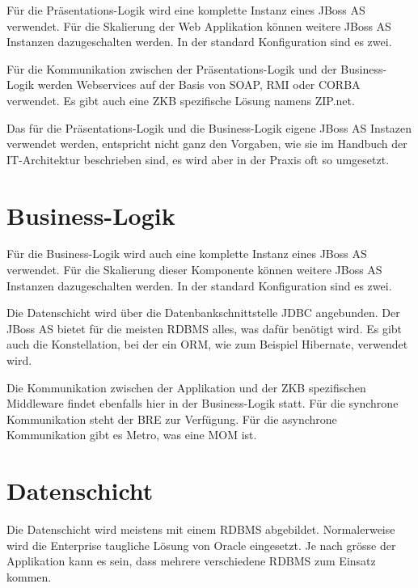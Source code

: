   Für die Präsentations-Logik wird eine komplette Instanz eines JBoss AS
  verwendet. Für die Skalierung der Web Applikation können weitere
  JBoss AS Instanzen dazugeschalten werden. In der standard Konfiguration sind
  es zwei.
  
  Für die Kommunikation zwischen der Präsentations-Logik und der Business-Logik
  werden Webservices auf der Basis von \ac{SOAP}, \ac{RMI} oder \ac{CORBA}
  verwendet. Es gibt auch eine \ac{ZKB} spezifische Lösung namens ZIP.net.
  
  Das für die Präsentations-Logik und die Business-Logik eigene JBoss AS
  Instazen verwendet werden, entspricht nicht ganz den Vorgaben, wie sie
  im Handbuch der IT-Architektur beschrieben sind, es wird aber in der Praxis
  oft so umgesetzt.
    
  \section{Business-Logik}
  
  Für die Business-Logik wird auch eine komplette Instanz eines JBoss AS
  verwendet. Für die Skalierung dieser Komponente können weitere JBoss AS
  Instanzen dazugeschalten werden. In der standard Konfiguration sind es zwei.
  
  Die Datenschicht wird über die Datenbankschnittstelle \ac{JDBC} angebunden.
  Der JBoss AS bietet für die meisten \ac{RDBMS} alles, was dafür benötigt
  wird. Es gibt auch die Konstellation, bei der ein \ac{ORM}, wie zum Beispiel
  Hibernate, verwendet wird.
  
  Die Kommunikation zwischen der Applikation und der ZKB spezifischen Middleware
  findet ebenfalls hier in der Business-Logik statt. Für die synchrone
  Kommunikation steht der \ac{BRE} zur Verfügung. Für die asynchrone
  Kommunikation gibt es Metro, was eine \ac{MOM} ist.
    
  \section{Datenschicht}
  
  Die Datenschicht wird meistens mit einem \ac{RDBMS} abgebildet. Normalerweise
  wird die Enterprise taugliche Lösung von Oracle eingesetzt. Je nach grösse
  der Applikation kann es sein, dass mehrere verschiedene \ac{RDBMS} zum Einsatz
  kommen.

